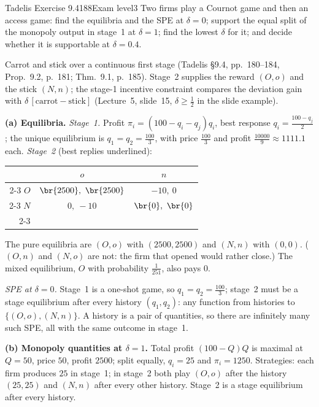 \begin{exsol}{Tadelis Exercise 9.4}{188}{Exam level}{3}
\asked Two firms play a Cournot game and then an access game: find the equilibria and the SPE at
$\delta = 0$; support the equal split of the monopoly output in stage~1 at $\delta = 1$; find the lowest
$\delta$ for it; and decide whether it is supportable at $\delta = 0.4$.

\method Carrot and stick over a continuous first stage (Tadelis \S9.4, pp.~180--184, Prop.~9.2, p.~181;
Thm.~9.1, p.~185). Stage~2 supplies the reward $(O,o)$ and the stick $(N,n)$; the stage-1 incentive
constraint compares the deviation gain with $\delta\,[\text{carrot} - \text{stick}]$ (Lecture~5, slide~15,
$\delta \ge \frac12$ in the slide example).

\solution
\textbf{(a) Equilibria.} \emph{Stage~1.} Profit $\pi_i = (100 - q_i - q_j)q_i$, best response
$q_i = \frac{100 - q_j}{2}$; the unique equilibrium is $q_1 = q_2 = \frac{100}{3}$, with price $\frac{100}{3}$ and profit
$\frac{10000}{9} \approx 1111.1$ each. \emph{Stage~2} (best replies underlined):
\begin{center}
\begin{tabular}{r|c|c|}
\multicolumn{1}{r}{} & \multicolumn{1}{c}{$o$} & \multicolumn{1}{c}{$n$}\\ \cline{2-3}
$O$ & $\br{2500},\ \br{2500}$ & $-10,\ 0$ \\ \cline{2-3}
$N$ & $0,\ -10$ & $\br{0},\ \br{0}$ \\ \cline{2-3}
\end{tabular}
\end{center}
The pure equilibria are $(O,o)$ with $(2500,2500)$ and $(N,n)$ with $(0,0)$. ($(O,n)$ and $(N,o)$ are not:
the firm that opened would rather close.) The mixed equilibrium, $O$ with probability $\frac{1}{251}$, also
pays $0$.

\emph{SPE at $\delta = 0$.} Stage~1 is a one-shot game, so $q_1 = q_2 = \frac{100}{3}$; stage~2 must be a stage
equilibrium after every history $(q_1,q_2)$: any function from histories to $\{(O,o), (N,n)\}$. A history is
a pair of quantities, so there are infinitely many such SPE, all with the same outcome in stage~1.

\textbf{(b) Monopoly quantities at $\delta = 1$.} Total profit $(100 - Q)Q$ is maximal at $Q = 50$, price $50$,
profit $2500$; split equally, $q_i = 25$ and $\pi_i = 1250$. Strategies: each firm produces $25$ in
stage~1; in stage~2 both play $(O,o)$ after the history $(25,25)$ and $(N,n)$ after every other history.
Stage~2 is a stage equilibrium after every history.


\end{exsol}
